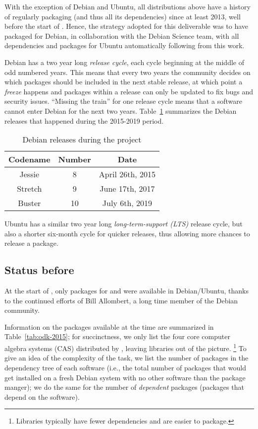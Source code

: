 \documentclass{deliverablereport}
\begin{document}
With the exception of Debian and Ubuntu, all distributions above have
a history of regularly packaging \Sage (and thus all its dependencies)
since at least 2013, well before the start of \ODK. %
Hence, the strategy adopted for this deliverable was to have \Sage
packaged for Debian, in collaboration with the Debian Science team,
with all \Sage dependencies and packages for Ubuntu automatically
following from this work.

Debian has a two year long \emph{release cycle}, each cycle beginning at the
middle of odd numbered years. %
This means that every two years the community decides on which
packages should be included in the next stable release, at which point
a \emph{freeze} happens and packages within a release can only be
updated to fix bugs and security issues. %
``Missing the train'' for one release cycle means that a software
cannot enter Debian for the next two years. %
Table~\ref{tab:debian} summarizes the Debian releases that happened
during the 2015-2019 period.

\begin{table}
  \centering
  \begin{tabular}{c c c}
    Codename & Number & Date\\
    \hline
    Jessie & 8 & April 26th, 2015\\
    Stretch & 9 & June 17th, 2017\\
    Buster & 10 & July 6th, 2019
  \end{tabular}
  \caption{Debian releases during the \ODK project}
  \label{tab:debian}
\end{table}

Ubuntu has a similar two year long \emph{long-term-support (LTS)}
release cycle, but also a shorter six-month cycle for quicker
releases, thus allowing more chances to release a package.

\subsection{Status before \ODK}

At the start of \ODK, only packages for \PariGP and \GAP were
available in Debian/Ubuntu, thanks to the continued efforts of Bill
Allombert, a long time member of the Debian community. %

Information on the packages available at the time are summarized in
Table~\ref{tab:odk-2015}; for succinctness, we only list the four
core computer algebra systems (CAS) distributed by \ODK, leaving libraries out
of the picture.%
\footnote{Libraries typically have fewer dependencies and are easier to
  package.} %
To give an idea of the complexity of the task, we list the number of
packages in the dependency tree of each software (i.e., the total
number of packages that would get installed on a fresh Debian system
with no other software than the package manger); we do the same for
the number of \emph{dependent} packages (packages that depend on the
software).
\end{document}
